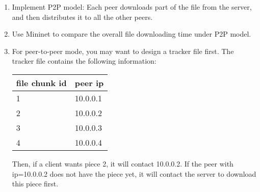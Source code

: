 \begin{enumerate}
    \item Implement P2P model: Each peer downloads part of the file from the server, and then distributes it to all the other peers.

    \item Use Mininet to compare the overall file downloading time under P2P model.
    
    \item For peer-to-peer mode, you may want to design a tracker file first. The tracker file contains the following information:
    
    \begin{table}[H]
    \centering
    \begin{tabular}{ll}
        \toprule
        file chunk id & peer ip \\
        \midrule
        1 & 10.0.0.1\\
        2 & 10.0.0.2\\
        3 & 10.0.0.3\\
        4 & 10.0.0.4\\
        \bottomrule
    \end{tabular}
    \end{table}

    Then, if a client wants piece 2, it will contact 10.0.0.2. If the peer with ip=10.0.0.2 does not have the piece yet, it will contact the server to download this piece first. 
\end{enumerate}

